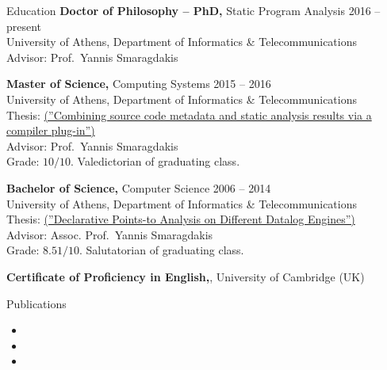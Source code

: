 \documentclass{resume}
\begin{document}
\begin{rSection}{Education}
  {\bf Doctor of Philosophy -- PhD,} Static Program Analysis \hfill {2016 -- present } \\
  University of Athens,  Department of Informatics \& Telecommunications \\
  Advisor: Prof.~Yannis Smaragdakis

  {\bf Master of Science,} Computing Systems \hfill {2015 -- 2016 } \\
  University of Athens,  Department of Informatics \& Telecommunications \\
  Thesis: \href{http://cgi.di.uoa.gr/~smaragd/theses/antoniadis2.pdf}{ (''Combining source code metadata and static analysis results via a compiler plug-in'')} \\
  Advisor: Prof.~Yannis Smaragdakis \\
  Grade: $10 / 10$. Valedictorian of graduating class.

  {\bf Bachelor of Science,}  Computer Science \hfill {2006 -- 2014}  \\
  University of Athens,  Department of Informatics \& Telecommunications \\
  Thesis: \href{http://cgi.di.uoa.gr/~smaragd/theses/antoniadis.pdf}{ (''Declarative Points-to Analysis on Different Datalog Engines'')} \\
  Advisor: Assoc. Prof.~Yannis Smaragdakis \\
  Grade: $8.51 / 10$. Salutatorian of graduating class.

  {\bf Certificate of Proficiency in English,}, University of Cambridge (UK)
\end{rSection}

\begin{rSection}{Publications}
  \begin{rSubsection}{}{}{}{}
    \begin{itemize} %
      \item {}
      \item {}
      \item {}
    \end{itemize}
  \end{rSubsection}
\end{rSection}
\end{document}
